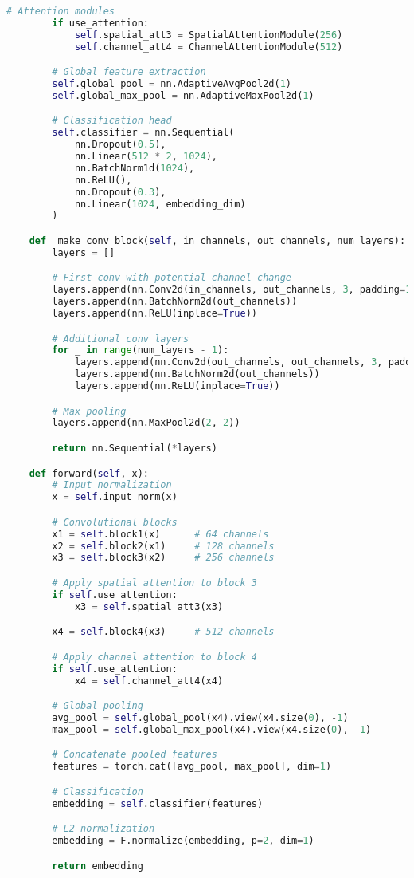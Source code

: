 \begin{lstlisting}[language=Python, caption=Enhanced Base CNN Architecture]
        # Attention modules
        if use_attention:
            self.spatial_att3 = SpatialAttentionModule(256)
            self.channel_att4 = ChannelAttentionModule(512)

        # Global feature extraction
        self.global_pool = nn.AdaptiveAvgPool2d(1)
        self.global_max_pool = nn.AdaptiveMaxPool2d(1)

        # Classification head
        self.classifier = nn.Sequential(
            nn.Dropout(0.5),
            nn.Linear(512 * 2, 1024),
            nn.BatchNorm1d(1024),
            nn.ReLU(),
            nn.Dropout(0.3),
            nn.Linear(1024, embedding_dim)
        )

    def _make_conv_block(self, in_channels, out_channels, num_layers):
        layers = []

        # First conv with potential channel change
        layers.append(nn.Conv2d(in_channels, out_channels, 3, padding=1))
        layers.append(nn.BatchNorm2d(out_channels))
        layers.append(nn.ReLU(inplace=True))

        # Additional conv layers
        for _ in range(num_layers - 1):
            layers.append(nn.Conv2d(out_channels, out_channels, 3, padding=1))
            layers.append(nn.BatchNorm2d(out_channels))
            layers.append(nn.ReLU(inplace=True))

        # Max pooling
        layers.append(nn.MaxPool2d(2, 2))

        return nn.Sequential(*layers)

    def forward(self, x):
        # Input normalization
        x = self.input_norm(x)

        # Convolutional blocks
        x1 = self.block1(x)      # 64 channels
        x2 = self.block2(x1)     # 128 channels
        x3 = self.block3(x2)     # 256 channels

        # Apply spatial attention to block 3
        if self.use_attention:
            x3 = self.spatial_att3(x3)

        x4 = self.block4(x3)     # 512 channels

        # Apply channel attention to block 4
        if self.use_attention:
            x4 = self.channel_att4(x4)

        # Global pooling
        avg_pool = self.global_pool(x4).view(x4.size(0), -1)
        max_pool = self.global_max_pool(x4).view(x4.size(0), -1)

        # Concatenate pooled features
        features = torch.cat([avg_pool, max_pool], dim=1)

        # Classification
        embedding = self.classifier(features)

        # L2 normalization
        embedding = F.normalize(embedding, p=2, dim=1)

        return embedding
\end{lstlisting}

